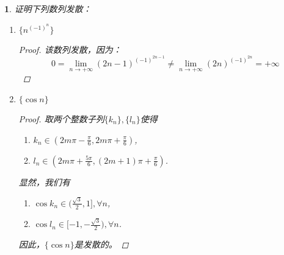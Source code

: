 \documentclass[utf8]{book}
\newtheorem{example}{}[section]             %
\begin{document}
\begin{example}
证明下列数列发散：
\renewcommand\labelenumi{\normalfont(\theenumi)}
\begin{enumerate}
\item $\{n^{(-1)^n}\}$
\begin{proof}
该数列发散，因为：
$$0 = \displaystyle \lim_{n\to +\infty}(2n-1)^{(-1)^{2n-1}} \neq \displaystyle \lim_{n\to +\infty}(2n)^{(-1)^{2n}} = +\infty$$
\end{proof}
\item $\{\cos n\}$
\begin{proof}
取两个整数子列$\{k_n\}, \{l_n\}$使得
\renewcommand\labelenumi{\normalfont(\theenumi)}
\begin{enumerate}
\item $k_n \in (2m\pi - \frac{\pi}{6},2m\pi + \frac{\pi}{6})$,
\item $l_n \in (2m\pi + \frac{5\pi}{6}, (2m+1)\pi + \frac{\pi}{6})$.
\end{enumerate}
显然，我们有
\renewcommand\labelenumi{\normalfont(\theenumi)}
\begin{enumerate}
\item $\cos k_n \in (\frac{\sqrt 3}{2}, 1], \forall n$,
\item $\cos l_n \in [-1, -\frac{\sqrt 3}{2}), \forall n$.
\end{enumerate}
因此，$\{\cos n\}$是发散的。
\end{proof}
\end{enumerate}
\end{example}
\end{document}
